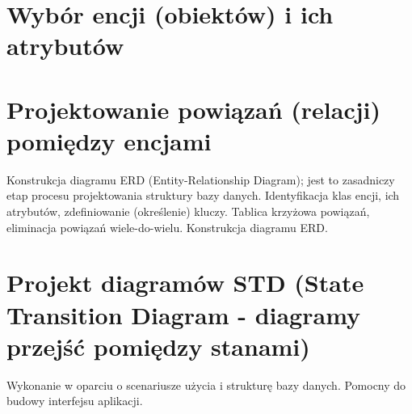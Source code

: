 \section{Wybór encji (obiektów) i ich atrybutów}
\section{Projektowanie powiązań (relacji) pomiędzy encjami}
Konstrukcja diagramu ERD
(Entity-Relationship Diagram); jest to zasadniczy etap procesu projektowania struktury
bazy danych. Identyfikacja klas encji, ich atrybutów, zdefiniowanie (określenie) kluczy.
Tablica krzyżowa powiązań, eliminacja powiązań wiele-do-wielu. Konstrukcja diagramu
ERD.
\section{Projekt diagramów STD (State Transition Diagram - diagramy przejść pomiędzy
stanami)}
Wykonanie w oparciu o scenariusze użycia i strukturę bazy danych. Pomocny do
budowy interfejsu aplikacji.

